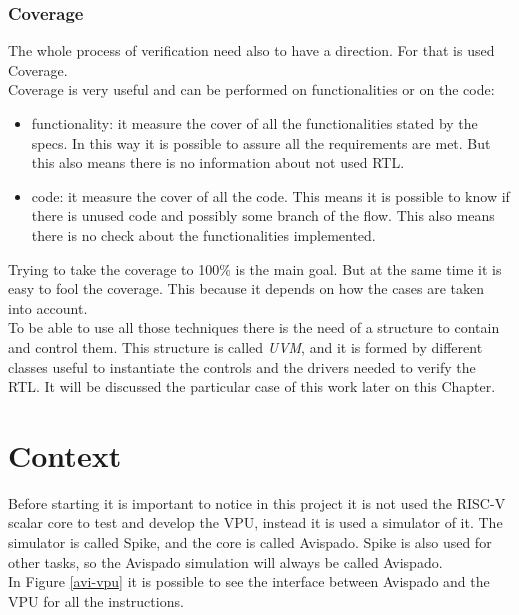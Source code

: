 \bigskip

\subsubsection{Coverage}
The whole process of verification need also to have a direction. For that is used Coverage. \\

Coverage is very useful and can be performed on functionalities or on the code:
\begin{itemize}
    \item functionality: it measure the cover of all the functionalities stated by the specs. In this way it is possible to assure all the requirements are met. But this also means there is no information about not used RTL.
    
    \item code: it measure the cover of all the code. This means it is possible to know if there is unused code and possibly some branch of the flow. This also means there is no check about the functionalities implemented.

\end{itemize}

Trying to take the coverage to 100\% is the main goal. But at the same time it is easy to fool the coverage. This because it depends on how the cases are taken into account. \\

To be able to use all those techniques there is the need of a structure to contain and control them.
This structure is called \textit{UVM}, and it is formed by different classes useful to instantiate the controls and the drivers needed to verify the RTL. It will be discussed the particular case of this work later on this Chapter.

\section{Context}
Before starting it is important to notice in this project it is not used the RISC-V scalar core to test and develop the VPU, instead it is used a simulator of it. The simulator is called Spike, and the core is called Avispado. Spike is also used for other tasks, so the Avispado simulation will always be called Avispado.\\
In Figure \ref{avi-vpu} it is possible to see the interface between Avispado and the VPU for all the instructions.\\


